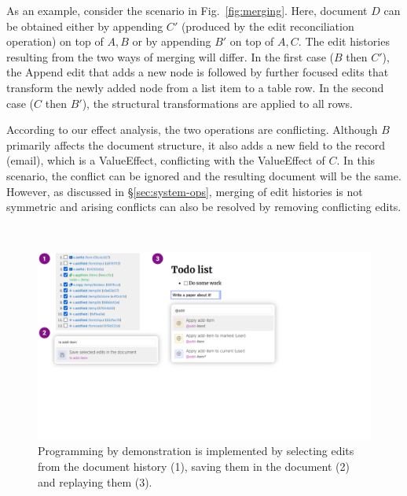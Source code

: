 \documentclass[sigconf,anonymous,screen]{acmart}
\newcommand{\ident}[1]{{\sffamily #1}}
\newcommand{\note}[1]{\textcolor{red}{#1}}
\begin{document}
As an example, consider the scenario in Fig.~\ref{fig:merging}. Here, document $D$ can be obtained
either by appending $C'$ (produced by the edit reconciliation operation) on top of $A,B$ or by
appending $B'$ on top of $A,C$. The edit histories resulting from the two ways of merging will
differ. In the first case ($B$ then $C'$), the \ident{Append} edit that adds a new node is followed
by further focused edits that transform the newly added node from a list item to a table row.
In the second case ($C$ then $B'$), the structural transformations are applied to all rows.

According to our effect analysis, the two operations are conflicting.
Although $B$ primarily affects the document structure, it also adds a new field to the record (email),
which is a \ident{ValueEffect}, conflicting with the \ident{ValueEffect} of $C$. In this scenario, the
conflict can be ignored and the resulting document will be the same.  However, as discussed
in \S\ref{sec:system-ops}, merging of edit histories is not symmetric and arising conflicts
can also be resolved by removing conflicting edits.

~



\begin{figure}[t]
\includegraphics[width=0.9\columnwidth,clip,trim=0cm 7cm 9cm 0cm]{fig/pbd.pdf}
\caption{Programming by demonstration is implemented by selecting edits from the document
history (1), saving them in the document (2) and replaying them (3).}
\label{fig:pbd}
\end{figure}
\end{document}

